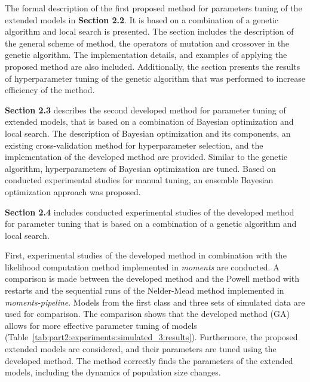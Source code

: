 The formal description of the first proposed method for parameters tuning of the extended models in \textbf{Section 2.2}.
It is based on a combination of a genetic algorithm and local search is presented.
The section includes the description of the general scheme of method, the operators of mutation and crossover in the genetic algorithm.
The implementation details, and examples of applying the proposed method are also included.
Additionally, the section presents the results of hyperparameter tuning of the genetic algorithm that was performed to increase efficiency of the method.

\textbf{Section 2.3} describes the second developed method for parameter tuning of extended models, that is based on a combination of Bayesian optimization and local search.
The description of Bayesian optimization and its components, an existing cross-validation method for hyperparameter selection, and the implementation of the developed method are provided.
Similar to the genetic algorithm, hyperparameters of Bayesian optimization are tuned.
Based on conducted experimental studies for manual tuning, an ensemble Bayesian optimization approach was proposed.

\textbf{Section 2.4} includes conducted experimental studies of the developed method for parameter tuning that is based on a combination of a genetic algorithm and local search.

First, experimental studies of the developed method in combination with the likelihood computation method implemented in \textit{moments} are conducted.
A comparison is made between the developed method and the Powell method with restarts and the sequential runs of the Nelder-Mead method implemented in \textit{moments-pipeline}.
Models from the first class and three sets of simulated data are used for comparison.
The comparison shows that the developed method (GA) allows for more effective parameter tuning of models (Table~\ref{tab:part2:experiments:simulated_3:results}).
Furthermore, the proposed extended models are considered, and their parameters are tuned using the developed method.
The method correctly finds the parameters of the extended models, including the dynamics of population size changes.


